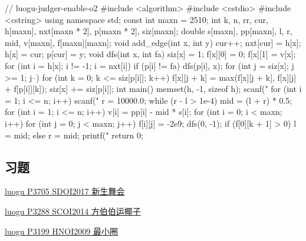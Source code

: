 \begin{cppcode}
// luogu-judger-enable-o2
#include <algorithm>
#include <cstdio>
#include <cstring>
using namespace std;
const int maxn = 2510;
int k, n, rr, cur, h[maxn], nxt[maxn * 2], p[maxn * 2], siz[maxn];
double s[maxn], pp[maxn], l, r, mid, v[maxn], f[maxn][maxn];
void add_edge(int x, int y) {
  cur++;
  nxt[cur] = h[x];
  h[x] = cur;
  p[cur] = y;
}
void dfs(int x, int fa) {
  siz[x] = 1;
  f[x][0] = 0;
  f[x][1] = v[x];
  for (int i = h[x]; i != -1; i = nxt[i])
    if (p[i] != fa) {
      dfs(p[i], x);
      for (int j = siz[x]; j >= 1; j--)
        for (int k = 0; k <= siz[p[i]]; k++)
          f[x][j + k] = max(f[x][j + k], f[x][j] + f[p[i]][k]);
      siz[x] += siz[p[i]];
    }
}
int main() {
  memset(h, -1, sizeof h);
  scanf("%
  for (int i = 1; i <= n; i++)
    scanf("%
  r = 10000.0;
  while (r - l > 1e-4) {
    mid = (l + r) * 0.5;
    for (int i = 1; i <= n; i++) v[i] = pp[i] - mid * s[i];
    for (int i = 0; i < maxn; i++)
      for (int j = 0; j < maxn; j++) f[i][j] = -2e9;
    dfs(0, -1);
    if (f[0][k + 1] > 0)
      l = mid;
    else
      r = mid;
  }
  printf("%
  return 0;
}
\end{cppcode}

\subsection{习题}
\href{https://www.luogu.org/problemnew/show/P3705}{ luogu P3705 SDOI2017 新生舞会 }

\href{https://www.luogu.org/problemnew/show/P3288}{ luogu P3288 SCOI2014 方伯伯运椰子 }

\href{https://www.luogu.org/problemnew/show/P3199}{ luogu P3199 HNOI2009 最小圈 }
